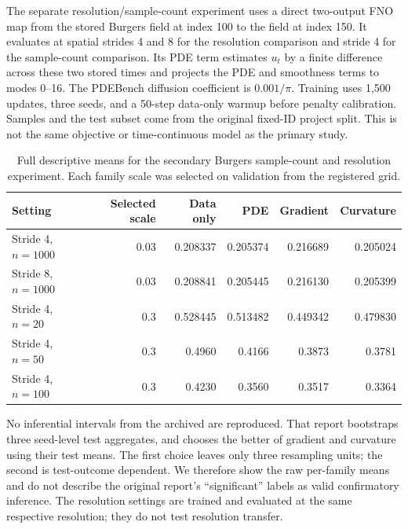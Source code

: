 \documentclass[10pt,a4paper]{article}
\begin{document}
The separate resolution/sample-count experiment uses a direct two-output FNO map from the stored Burgers field at index 100 to the field at index 150. It evaluates at spatial strides 4 and 8 for the resolution comparison and stride 4 for the sample-count comparison. Its PDE term estimates $u_t$ by a finite difference across these two stored times and projects the PDE and smoothness terms to modes 0--16. The PDEBench diffusion coefficient is $0.001/\pi$. Training uses 1,500 updates, three seeds, and a 50-step data-only warmup before penalty calibration. Samples and the test subset come from the original fixed-ID project split. This is not the same objective or time-continuous model as the primary study.

\begin{table}[H]
\centering\scriptsize
\caption{Full descriptive means for the secondary Burgers sample-count and resolution experiment. Each family scale was selected on validation from the registered grid.}
\label{tab:h2h3full}
\begin{tabular}{lrrrrr}
\toprule
Setting & Selected scale & Data only & PDE & Gradient & Curvature \\
\midrule
Stride 4, $n=1000$ & 0.03 & 0.208337 & 0.205374 & 0.216689 & 0.205024 \\
Stride 8, $n=1000$ & 0.03 & 0.208841 & 0.205445 & 0.216130 & 0.205399 \\
Stride 4, $n=20$ & 0.3 & 0.528445 & 0.513482 & 0.449342 & 0.479830 \\
Stride 4, $n=50$ & 0.3 & 0.4960 & 0.4166 & 0.3873 & 0.3781 \\
Stride 4, $n=100$ & 0.3 & 0.4230 & 0.3560 & 0.3517 & 0.3364 \\
\bottomrule
\end{tabular}
\end{table}

No inferential intervals from the archived  are reproduced. That report bootstraps three seed-level test aggregates, and chooses the better of gradient and curvature using their test means. The first choice leaves only three resampling units; the second is test-outcome dependent. We therefore show the raw per-family means and do not describe the original report's “significant” labels as valid confirmatory inference. The resolution settings are trained and evaluated at the same respective resolution; they do not test resolution transfer.
\end{document}
